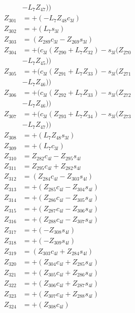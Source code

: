 \begin{multicols}{2}
\begin{align}
&- L_7Z_{47})) \nonumber \\
Z_{301} &= + (-L_7Z_{48}c_{3l}) \nonumber \\
Z_{302} &= + (L_7s_{3l}) \nonumber \\
Z_{303} &= (Z_{289}c_{3l} - Z_{269}s_{3l}) \nonumber \\
Z_{304} &= + (c_{3l}(Z_{290} + L_7Z_{32}) - s_{3l}(Z_{270}  \nonumber \\
&- L_7Z_{45})) \nonumber \\
Z_{305} &= + (c_{3l}(Z_{291} + L_7Z_{33}) - s_{3l}(Z_{271}  \nonumber \\
&- L_7Z_{46})) \nonumber \\
Z_{306} &= + (c_{3l}(Z_{292} + L_7Z_{33}) - s_{3l}(Z_{272}  \nonumber \\
&- L_7Z_{46})) \nonumber \\
Z_{307} &= + (c_{3l}(Z_{293} + L_7Z_{34}) - s_{3l}(Z_{273}  \nonumber \\
&- L_7Z_{47})) \nonumber \\
Z_{308} &= + (L_7Z_{48}s_{3l}) \nonumber \\
Z_{309} &= + (L_7c_{3l}) \nonumber \\
Z_{310} &= Z_{282}c_{4l} - Z_{295}s_{4l} \nonumber \\
Z_{311} &= Z_{295}c_{4l} + Z_{282}s_{4l} \nonumber \\
Z_{312} &= (Z_{284}c_{4l} - Z_{303}s_{4l}) \nonumber \\
Z_{313} &= + (Z_{285}c_{4l} - Z_{304}s_{4l}) \nonumber \\
Z_{314} &= + (Z_{286}c_{4l} - Z_{305}s_{4l}) \nonumber \\
Z_{315} &= + (Z_{287}c_{4l} - Z_{306}s_{4l}) \nonumber \\
Z_{316} &= + (Z_{288}c_{4l} - Z_{307}s_{4l}) \nonumber \\
Z_{317} &= + (-Z_{308}s_{4l}) \nonumber \\
Z_{318} &= + (-Z_{309}s_{4l}) \nonumber \\
Z_{319} &= (Z_{303}c_{4l} + Z_{284}s_{4l}) \nonumber \\
Z_{320} &= + (Z_{304}c_{4l} + Z_{285}s_{4l}) \nonumber \\
Z_{321} &= + (Z_{305}c_{4l} + Z_{286}s_{4l}) \nonumber \\
Z_{322} &= + (Z_{306}c_{4l} + Z_{287}s_{4l}) \nonumber \\
Z_{323} &= + (Z_{307}c_{4l} + Z_{288}s_{4l}) \nonumber \\
Z_{324} &= + (Z_{308}c_{4l}) \nonumber \\ 

\end{align}
\end{multicols}
